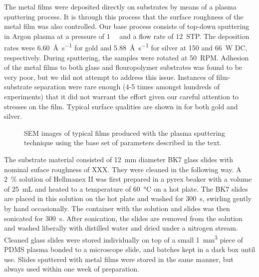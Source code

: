 The metal films were deposited directly on substrates by means of a plasma
sputtering process.  It is through this process that the surface roughness
of the metal film was also controlled.  Our base process consists of
top-down sputtering in Argon plasma at a pressure of \SI{1}{\milli\torr}
and a flow rate of \SI{12}{STP}.  The deposition rates were
\SI{6.60}{\angstrom\per\second} for gold and
\SI{5.88}{\angstrom\per\second} for silver at 150 and \SI{66}{\watt} DC,
respectively.  During sputtering, the samples were rotated at \SI{50}{RPM}.
Adhesion of the metal films to both glass and flouropolymer substrates was
found to be very poor, but we did not attempt to address this issue.
Instances of film-substrate separation were rare enough (4-5 times amongst
hundreds of experiments) that it did not warrant the effort given our
careful attention to stresses on the film.  Typical surface qualities are
shown in  for both gold and silver.  
\begin{figure}
\centering
\ersatzfigure
\caption{SEM images of typical films produced with the plasma sputtering
technique using the base set of parameters described in the text.}
\label{fig:semsputter}
\end{figure}

The substrate material consisted of \SI{12}{\milli\meter} diameter BK7
glass slides with nominal suface roughness of XXX.  They were cleaned in
the following way.  A \SI{2}{\percent} solution of Hellmanex II was first
prepared in a pyrex beaker with a volume of \SI{25}{\milli\liter} and
heated to a temperature of \SI{60}{\celsius} on a hot plate.  The BK7
slides are placed in this solution on the hot plate and washed for
\SI{300}{\second}, swirling gently by hand occasionally.  The container
with the solution and slides was then sonicated for \SI{300}{\second}.
After sonication, the slides are removed from the solution and washed
liberally with distilled water and dried under a nitrogen stream.  Cleaned
glass slides were stored individually on top of a small
\SI{1}{\milli\meter\cubed} piece of PDMS plasma bonded to a microscope
slide, and batches kept in a dark box until use.  Slides sputtered with
metal films were stored in the same manner, but always used within one week
of preparation.

